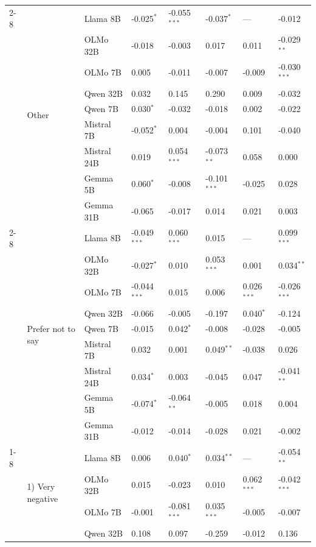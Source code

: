 \begin{longtable}[t]{llllllll}
\cline{2-8}
 & \multirow[t]{9}{*}{Other} & Llama 8B & -0.025$^{*}$ & -0.055$^{***}$ & -0.037$^{*}$ & --- & -0.012 \\
 &  & OLMo 32B & -0.018 & -0.003 & 0.017 & 0.011 & -0.029$^{**}$ \\
 &  & OLMo 7B & 0.005 & -0.011 & -0.007 & -0.009 & -0.030$^{***}$ \\
 &  & Qwen 32B & 0.032 & 0.145 & 0.290 & 0.009 & -0.032 \\
 &  & Qwen 7B & 0.030$^{*}$ & -0.032 & -0.018 & 0.002 & -0.022 \\
 &  & Mistral 7B & -0.052$^{*}$ & 0.004 & -0.004 & 0.101 & -0.040 \\
 &  & Mistral 24B & 0.019 & 0.054$^{***}$ & -0.073$^{**}$ & 0.058 & 0.000 \\
 &  & Gemma 5B & 0.060$^{*}$ & -0.008 & -0.101$^{***}$ & -0.025 & 0.028 \\
 &  & Gemma 31B & -0.065 & -0.017 & 0.014 & 0.021 & 0.003 \\
\cline{2-8}
 & \multirow[t]{9}{*}{Prefer not to say} & Llama 8B & -0.049$^{***}$ & 0.060$^{***}$ & 0.015 & --- & 0.099$^{***}$ \\
 &  & OLMo 32B & -0.027$^{*}$ & 0.010 & 0.053$^{***}$ & 0.001 & 0.034$^{**}$ \\
 &  & OLMo 7B & -0.044$^{***}$ & 0.015 & 0.006 & 0.026$^{***}$ & -0.026$^{***}$ \\
 &  & Qwen 32B & -0.066 & -0.005 & -0.197 & 0.040$^{*}$ & -0.124 \\
 &  & Qwen 7B & -0.015 & 0.042$^{*}$ & -0.008 & -0.028 & -0.005 \\
 &  & Mistral 7B & 0.032 & 0.001 & 0.049$^{**}$ & -0.038 & 0.026 \\
 &  & Mistral 24B & 0.034$^{*}$ & 0.003 & -0.045 & 0.047 & -0.041$^{**}$ \\
 &  & Gemma 5B & -0.074$^{*}$ & -0.064$^{**}$ & -0.005 & 0.018 & 0.004 \\
 &  & Gemma 31B & -0.012 & -0.014 & -0.028 & 0.021 & -0.002 \\
\cline{1-8} \cline{2-8}
\multirow[t]{45}{*}{Technology Impact} & \multirow[t]{9}{*}{1) Very negative} & Llama 8B & 0.006 & 0.040$^{*}$ & 0.034$^{**}$ & --- & -0.054$^{**}$ \\
 &  & OLMo 32B & 0.015 & -0.023 & 0.010 & 0.062$^{***}$ & -0.042$^{***}$ \\
 &  & OLMo 7B & -0.001 & -0.081$^{***}$ & 0.035$^{***}$ & -0.005 & -0.007 \\
 &  & Qwen 32B & 0.108 & 0.097 & -0.259 & -0.012 & 0.136 \\

\end{longtable}
